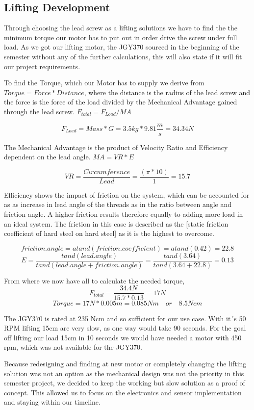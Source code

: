 \documentclass[../report.tex]{subfiles}
\begin{document}
\maketitle

\subsection{Lifting Development}
Through choosing the lead screw as a lifting solutions we have to find the
the minimum torque our motor has to put out in order drive the screw under full load.
As we got our lifting motor, the JGY370 sourced in the beginning of the semester without 
any of the further calculations, this will also state if it will fit our project requirements.

To find the Torque, which our Motor has to supply we derive from $Torque=Force*Distance$, where the 
distance is the radius of the lead screw and the force is the force of the load divided by the Mechanical 
Advantage gained through the lead screw. $F_{total}=F_{Load}/MA$

\[F_{Load}=Mass*G=3.5kg*9.81\frac{m}{s}=34.34N\]

The Mechanical Advantage is the product of Velocity Ratio and Efficiency dependent on the lead 
angle. $MA=VR*E$ 

\[VR=\frac{Circumference}{Lead}=\frac{(\pi*10)}{1}=15.7\]

Efficiency shows the impact of friction on the system, which can be accounted for as as increase in lead angle of the threads 
as in the ratio between angle and friction angle. A higher friction results therefore equally to adding more load in an ideal 
system. The friction in this case is described as the \cite{friction_coefficient}[static 
friction coefficient of hard steel on hard steel] as it is the highest to overcome. 

\[friction.angle=atand(friction.coefficient)= atand(0.42)=22.8\]
\[E=\frac{tand(lead.angle)}{tand(lead.angle+friction.angle)}=\frac{tand(3.64)}{tand(3.64+22.8)}=0.13\]

From where we now have all to calculate the needed torque, 
\[F_{total}=\frac{34.4N}{15.7*0.13}=17N\]
\[Torque=17N*0.005m=0.085Nm\quad or \quad 8.5Ncm\]

The JGY370 is rated at 235 Ncm and so sufficient for our use case. With it´s 50 RPM
lifting 15cm are very slow, as one way would take 90 seconds. For the goal off lifting 
our load 15cm in 10 seconds we would have needed a motor with 450 rpm, which was not 
available for the JGY370.

Because redesigning and finding at new motor 
or completely changing the lifting solution was not an option as the mechanical design 
was not the priority in this semester project, we decided to keep the working but slow 
solution as a proof of concept. This allowed us to focus on the electronics and sensor 
implementation and staying within our timeline.
\end{document}
